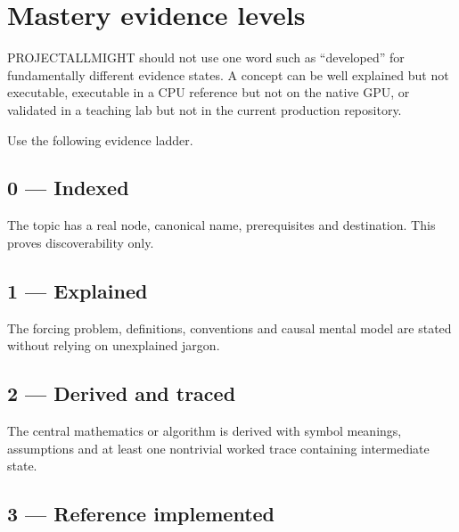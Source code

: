 \hypertarget{appendix-2a2e5bd7143a}{}\label{referencestart:appendix-2a2e5bd7143a}
\section{Mastery evidence levels}\label{appendix-2a2e5bd7143a-mastery-evidence-levels}

\hypertarget{appendix-2a2e5bd7143a-mastery-evidence-levels}{}

PROJECTALLMIGHT should not use one word such as ``developed'' for fundamentally different evidence states. A concept can be well explained but not executable, executable in a CPU reference but not on the native GPU, or validated in a teaching lab but not in the current production repository.

Use the following evidence ladder.

\subsection{0 --- Indexed}\label{appendix-2a2e5bd7143a-indexed}

\hypertarget{appendix-2a2e5bd7143a-indexed}{}

The topic has a real node, canonical name, prerequisites and destination. This proves discoverability only.

\subsection{1 --- Explained}\label{appendix-2a2e5bd7143a-explained}

\hypertarget{appendix-2a2e5bd7143a-explained}{}

The forcing problem, definitions, conventions and causal mental model are stated without relying on unexplained jargon.

\subsection{2 --- Derived and traced}\label{appendix-2a2e5bd7143a-derived-and-traced}

\hypertarget{appendix-2a2e5bd7143a-derived-and-traced}{}

The central mathematics or algorithm is derived with symbol meanings, assumptions and at least one nontrivial worked trace containing intermediate state.

\subsection{3 --- Reference implemented}\label{appendix-2a2e5bd7143a-reference-implemented}

